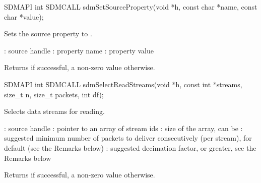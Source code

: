 \documentclass[a4paper,12pt,twoside,extrafontsizes]{memoir}
\begin{document}


\begin{cfuncprototype}
SDMAPI int SDMCALL sdmSetSourceProperty(void *h, const char *name, const char *value);
\end{cfuncprototype}

\begin{funcdescr}
	Sets the source property  to .
\end{funcdescr}

\begin{funcparams}
	: source handle
	: property name
	: property value
\end{funcparams}

\begin{funcret}
	Returns  if successful, a non-zero value otherwise.
\end{funcret}



\begin{cfuncprototype}
SDMAPI int SDMCALL sdmSelectReadStreams(void *h, const int *streams, size_t n, size_t packets, int df);
\end{cfuncprototype}

\begin{funcdescr}
	Selects data streams for reading.
\end{funcdescr}

\begin{funcparams}
	: source handle
	: pointer to an array of stream ids
	: size of the array, can be 
	: suggested minimum number of packets to deliver consecutively (per stream),  for default (see the Remarks below)
	: suggested decimation factor,  or greater, see the Remarks below
\end{funcparams}

\begin{funcret}
	Returns  if successful, a non-zero value otherwise.
\end{funcret}
\end{document}
